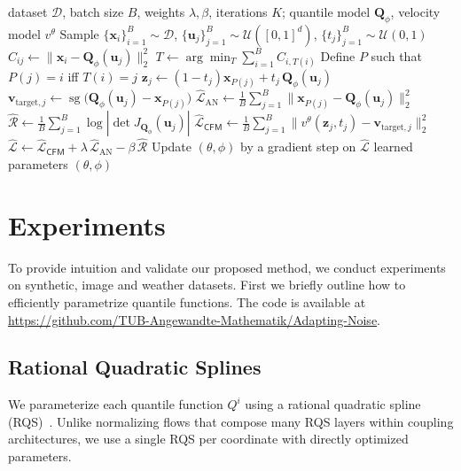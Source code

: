 \documentclass{article}
\theoremstyle{plain}
\theoremstyle{definition}
\theoremstyle{remark}
\begin{document}
\begin{algorithm}[h]
  \caption{Joint learning of 1D quantiles and FM velocity}
  \label{alg:learn-quantile-fm}
  \begin{algorithmic}
     dataset $\mathcal D$, batch size $B$, weights $\lambda,\beta$, iterations $K$; quantile model $\mathbf Q_\phi$, velocity model $v^\theta$
      \STATE Sample $\{\mathbf x_i\}_{i=1}^B \sim \mathcal D$, $\{\mathbf u_j\}_{j=1}^B \sim \mathcal U([0,1]^d)$, $\{t_j\}_{j=1}^B \sim \mathcal U(0,1)$
      \STATE $C_{ij} \gets \|\mathbf x_i-\mathbf Q_\phi(\mathbf u_j)\|_2^2$
      \STATE $T \gets \arg\min_{T}\sum_{i=1}^B C_{i,T(i)}$ %
      \STATE Define $P$ such that $P(j)=i$ iff $T(i)=j$
        \STATE $\mathbf z_j \gets (1-t_j)\mathbf x_{P(j)} + t_j\,\mathbf Q_\phi(\mathbf u_j)$
        \STATE $\mathbf v_{\mathrm{target},j} \gets \operatorname{sg}\!\big(\mathbf Q_\phi(\mathbf u_j) - \mathbf x_{P(j)}\big)$
      \ENDFOR
      \STATE $\widehat{\mathcal L}_{\mathrm{AN}} \gets \frac{1}{B}\sum_{j=1}^B \|\mathbf x_{P(j)}-\mathbf Q_\phi(\mathbf u_j)\|_2^2$
      \STATE $\widehat{\mathcal R} \gets \frac{1}{B}\sum_{j=1}^B \log \left|\det J_{\mathbf Q_\phi}(\mathbf u_j)\right|$
      \STATE $\widehat{\mathcal L}_{\mathsf{CFM}} \gets \frac{1}{B}\sum_{j=1}^B \|v^\theta(\mathbf z_j,t_j) - \mathbf v_{\mathrm{target},j}\|_2^2$
      \STATE $\widehat{\mathcal L} \gets \widehat{\mathcal L}_{\mathsf{CFM}} + \lambda\,\widehat{\mathcal L}_{\mathrm{AN}} - \beta\,\widehat{\mathcal R}$
      \STATE Update $(\theta,\phi)$ by a gradient step on $\widehat{\mathcal L}$
    \ENDFOR
     learned parameters $(\theta,\phi)$
  \end{algorithmic}
\end{algorithm}


\section{Experiments} \label{sec:numerics}
To {provide intuition and} validate our proposed method, we conduct experiments on synthetic, {image} and weather datasets. First we briefly outline how to efficiently parametrize quantile functions. The code is available at \url{https://github.com/TUB-Angewandte-Mathematik/Adapting-Noise}.

\subsection{Rational Quadratic Splines}\label{subsec:RQS}
We parameterize each quantile function $Q^i$ using a rational quadratic 
spline (RQS)~\cite{GD1982, durkan2019neural}. Unlike normalizing flows 
that compose many RQS layers within coupling architectures, we use a 
single RQS per coordinate with directly optimized parameters.
\end{document}
